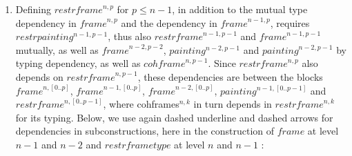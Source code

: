 \documentclass{article}
\newcommand{\myframe}{\mathit{frame}}
\newcommand{\painting}{\mathit{painting}}
\newcommand{\restrframe}{\mathit{restrframe}}
\newcommand{\restrframetype}{\mathit{restrframetype}}
\newcommand{\restrpainting}{\mathit{restrpainting}}
\newcommand{\cohframe}{\mathit{cohframe}}
\newcommand{\udensdash}[1]{%
    \tikz[baseline=(todotted.base)]{
        \node[inner sep=1pt,outer sep=0pt] (todotted) {$#1$};
        \draw[densely dashed] (todotted.south west) -- (todotted.south east);
    }%
}%
\begin{document}
\begin{enumerate}
$$\begin{array}{llcl}
\begin{array}{l}
\begin{array}{l}
                                    \restrframe^{n,[0,...,p]} \\
                                    \restrframe^{n,[p+1,...,n-1]} \\
                                    E \\
                        \end{array}\right)(d,l) \\
                    \end{array}\right)                    \\
          \end{array}
          $$

          From which we can deduce $\painting^{n,[0,...,p]}$ by recursion on $p$.

  \item Defining $\restrframe^{n,p}$ for $p\leq n-1$, in addition to the
        mutual type dependency in $\myframe^{n,p}$ and the dependency in
        $\myframe^{n-1,p}$, requires $\restrpainting^{n-1,p-1}$, thus also
        $\restrframe^{n-1,p-1}$ and $\myframe^{n-1,p-1}$ mutually, as well
        as $\myframe^{n-2,p-2}$, $painting^{n-2,p-1}$ and
        $\painting^{n-2,p-1}$ by typing dependency, as well as
        $\cohframe^{n,p-1}$. Since $\restrframe^{n,p}$ also depends on
        $\restrframe^{n,p-1}$, these dependencies are between the blocks
        $\myframe^{n,[0..p]}$, $\myframe^{n-1,[0..p]}$,
        $\myframe^{n-2,[0..p]}$, $\painting^{n-1,[0..p-1]}$ and
        $\restrframe^{n,[0..p-1]}$, where cohframes$^{n,k}$ in turn depends
        in $\restrframe^{n,k}$ for its typing. Below, we use again dashed
        underline and dashed arrows for dependencies in subconstructions,
        here in the construction of $\myframe$ at level $n-1$ and $n-2$ and $\restrframetype$ at level $n$ and $n-1$ :

        \begin{center}
        \end{center}


\end{enumerate}
\end{document}
